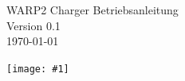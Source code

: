 \documentclass[a4paper,10pt]{article}
\title{}
\author{}
\newcommand{\gfx}[1]{\texttt{[image: \#1]}}
\begin{document}
\pagestyle{empty}
\begin{titlepage}
	\vspace*{-3.08cm}
	\colorbox{boxgray}{}
	\vfill
	\begin{center}
		\Huge
		WARP2 Charger Betriebsanleitung\\\vspace{1cm}
		\large
		Version 0.1\\\vspace{0.25cm}
		\today
	\end{center}
	\vfill \gfx{./img_warp2/resized/warp_perspective_blue_ready}
\end{titlepage}
\newpage
\null
\newpage
\pagestyle{fancy}
\end{document}

